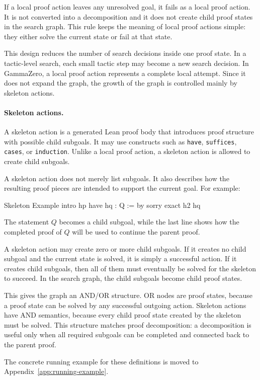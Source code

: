If a local proof action leaves any unresolved goal, it fails as a local proof action. It is not converted into a decomposition and it does not create child proof states in the search graph. This rule keeps the meaning of local proof actions simple: they either solve the current state or fail at that state.

This design reduces the number of search decisions inside one proof state. In a tactic-level search, each small tactic step may become a new search decision. In GammaZero, a local proof action represents a complete local attempt. Since it does not expand the graph, the growth of the graph is controlled mainly by skeleton actions.

\paragraph{Skeleton actions.}
A skeleton action is a generated Lean proof body that introduces proof structure with possible child subgoals. It may use constructs such as \texttt{have}, \texttt{suffices}, \texttt{cases}, or \texttt{induction}. Unlike a local proof action, a skeleton action is allowed to create child subgoals.

A skeleton action does not merely list subgoals. It also describes how the resulting proof pieces are intended to support the current goal. For example:
\begin{leantitledblock}{Skeleton Example}
intro hp
have hq : Q := by
  sorry
exact h2 hq
\end{leantitledblock}
The statement \(Q\) becomes a child subgoal, while the last line shows how the completed proof of \(Q\) will be used to continue the parent proof.

A skeleton action may create zero or more child subgoals. If it creates no child subgoal and the current state is solved, it is simply a successful action. If it creates child subgoals, then all of them must eventually be solved for the skeleton to succeed. In the search graph, the child subgoals become child proof states.

This gives the graph an AND/OR structure. OR nodes are proof states, because a proof state can be solved by any successful outgoing action. Skeleton actions have AND semantics, because every child proof state created by the skeleton must be solved. This structure matches proof decomposition: a decomposition is useful only when all required subgoals can be completed and connected back to the parent proof.

The concrete running example for these definitions is moved to Appendix~\ref{app:running-example}.

